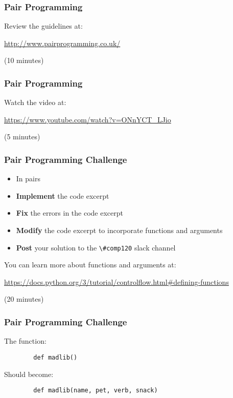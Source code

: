 \begin{frame}
	\frametitle{Pair Programming}
	
	Review the guidelines at:
	
	\vspace{1.5em}
		
	\url{http://www.pairprogramming.co.uk/}
	
	\vspace{1em}
		
	(10 minutes)
	
\end{frame}

\begin{frame}
	\frametitle{Pair Programming}
	
	Watch the video at:
	
	\vspace{1.5em}
		
	\url{https://www.youtube.com/watch?v=ONnYCT_LJio}
	
	\vspace{1em}
		
	(5 minutes)
	
\end{frame}

\begin{frame}
	\frametitle{Pair Programming Challenge}
	
	\begin{itemize}
		\item In pairs
		\item \textbf{Implement} the code excerpt
		\item \textbf{Fix} the errors in the code excerpt
		\item \textbf{Modify} the code excerpt to incorporate functions and arguments
		\item \textbf{Post} your solution to the \lstinline{\#comp120} slack channel
	\end{itemize}
	
	You can learn more about functions and arguments at:
	
	\vspace{1em}
	
	 \url{https://docs.python.org/3/tutorial/controlflow.html\#defining-functions}
	
	\vspace{1em}
	
	(20 minutes)
	
\end{frame}

\begin{frame}[fragile]
	\frametitle{Pair Programming Challenge}
	
	The function:

	\begin{lstlisting}
		def madlib()
	\end{lstlisting}
	
	\vspace{1.5em}
	
	Should become:
	
	\begin{lstlisting}
		def madlib(name, pet, verb, snack)
	\end{lstlisting}
	
\end{frame}

